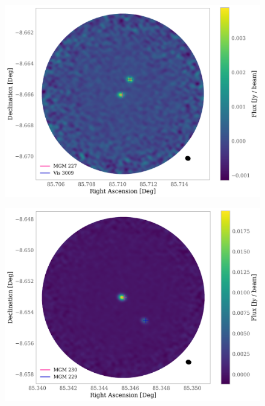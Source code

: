\documentclass{aa}
\begin{document}
\begin{appendix}
\begin{figure}
\centering
   \includegraphics[width=\columnwidth]{MGM_227.png}
     \caption{}
\end{figure}

\begin{figure}
\centering
   \includegraphics[width=\columnwidth]{MGM_230.png}
     \caption{}
\end{figure}


\end{appendix}
\end{document}
